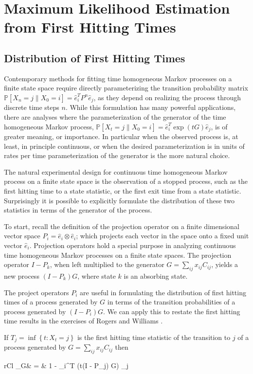 \chapter{Maximum Likelihood Estimation from First Hitting Times}
\section{Distribution of First Hitting Times}
Contemporary methods for fitting time homogeneous Markov processes on a finite 
state space require directly parameterizing the transition probability matrix $\mathbb{P}\left[X_n = j \left\|X_0 = i \right.\right] = \hat{e}_i^T P^n \hat{e}_j$,
as they depend on realizing the process through discrete time steps $n$. While this 
formulation has many powerful applications, there are analyses where the parameterization of 
the generator of the time homogeneous Markov process, $\mathbb{P}\left[X_t = j \left\|X_0 = i \right.\right] = \hat{e}_i^T \exp\left({tG}\right) \hat{e}_j$, 
is of greater meaning, or importance. In particular when the observed process is, at least,
in principle continuous, or when the desired parameterization is in units of rates per time
parameterization of the generator is the more natural choice.

The natural experimental design for continuous time homogeneous Markov process on a finite
state space is the observation of a stopped process, such as the first hitting time to a
state statistic, or the first exit time from a state statistic. Surprisingly it is possible
to explicitly formulate the distribution of these two statistics in terms of the generator
of the process.

To start, recall the definition of the projection operator on a finite dimensional vector
space $P_i = \hat{e}_i \otimes \hat{e}_i$; which projects each vector in the space onto a
fixed unit vector $\hat{e}_i$. Projection operators hold a special purpose in analyzing
continuous time homogeneous Markov processes on a finite state spaces. The projection
operator $I-P_k$, when left multiplied to the generator $G = \sum_{ij}x_{ij}C_{ij}$, yields 
a new process $\left(I-P_k\right)G$, where state $k$ is an absorbing state.

The project operators $P_i$ are useful in formulating the distribution of first hitting 
times of a process generated by $G$ in terms of the transition probabilities of a process
generated by $\left(I-P_i\right)G$. We can apply this to restate the first hitting time 
results in the exercises of Rogers and Williams \cite{rogers_diffusions_2000}.
\begin{theorem}
	If $T_j = \inf\left\lbrace t: X_t=j\right\rbrace$ is the first 
	hitting time statistic of the transition to $j$ of a process generated by $G = \sum_{ij}x_{ij}C_{ij}$
	then
	\begin{IEEEeqnarray*}{rCl}
		_G\left[T_j \le t \left\| X_0=i \right.\right]
			& = & 1 - _i^T \exp\left(t\left(I - P_j\right) G\right) _j
	\end{IEEEeqnarray*}
\end{theorem}

